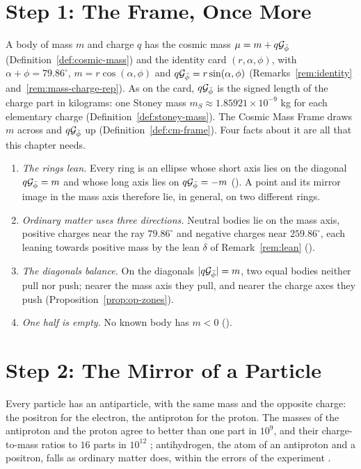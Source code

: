 \section{Step 1: The Frame, Once More}\label{sec:fa-frame}

A body of mass $m$ and charge $q$ has the cosmic mass $\mu = m + q\mathcal{G}_{\bar{\phi}}$ (Definition~\ref{def:cosmic-mass}) and the identity card $(r, \alpha, \phi)$, with $\alpha + \phi = 79.86^\circ$, $m = r\cos(\alpha, \phi)$ and $q\mathcal{G}_{\bar{\phi}} = r\sin(\alpha, \phi)$ (Remarks~\ref{rem:identity} and~\ref{rem:mass-charge-rep}). As on the card, $q\mathcal{G}_{\bar{\phi}}$ is the signed length of the charge part in kilograms: one Stoney mass $m_S \approx 1.85921 \times 10^{-9}$ kg for each elementary charge (Definition~\ref{def:stoney-mass}). The Cosmic Mass Frame draws $m$ across and $q\mathcal{G}_{\bar{\phi}}$ up (Definition~\ref{def:cm-frame}). Four facts about it are all that this chapter needs.
\begin{enumerate}
  \item \emph{The rings lean.} Every ring is an ellipse whose short axis lies on the diagonal $q\mathcal{G}_{\bar{\phi}} = m$ and whose long axis lies on $q\mathcal{G}_{\bar{\phi}} = -m$ (). A point and its mirror image in the mass axis therefore lie, in general, on two different rings.
  \item \emph{Ordinary matter uses three directions.} Neutral bodies lie on the mass axis, positive charges near the ray $79.86^\circ$ and negative charges near $259.86^\circ$, each leaning towards positive mass by the lean $\delta$ of Remark~\ref{rem:lean} ().
  \item \emph{The diagonals balance.} On the diagonals $|q\mathcal{G}_{\bar{\phi}}| = m$, two equal bodies neither pull nor push; nearer the mass axis they pull, and nearer the charge axes they push (Proposition~\ref{prop:op-zones}).
  \item \emph{One half is empty.} No known body has $m < 0$ ().
\end{enumerate}

\section{Step 2: The Mirror of a Particle}\label{sec:fa-mirror}

Every particle has an antiparticle, with the same mass and the opposite charge: the positron for the electron, the antiproton for the proton. The masses of the antiproton and the proton agree to better than one part in $10^9$, and their charge-to-mass ratios to $16$ parts in $10^{12}$ \citep{PDG2024,Borchert2022}; antihydrogen, the atom of an antiproton and a positron, falls as ordinary matter does, within the errors of the experiment \citep{Anderson2023}.

